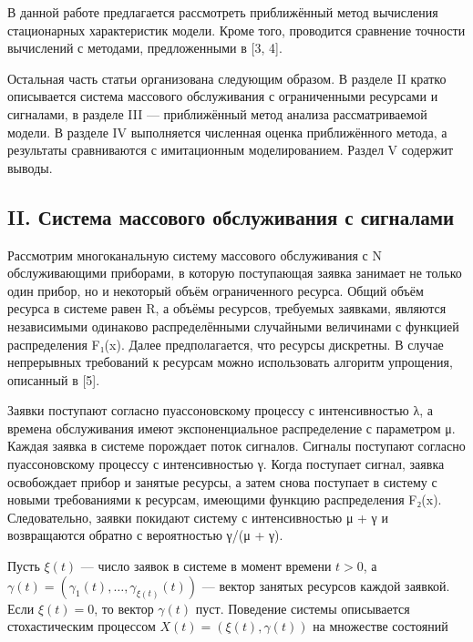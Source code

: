 В данной работе предлагается рассмотреть приближённый метод вычисления
стационарных характеристик модели. Кроме того, проводится сравнение
точности вычислений с методами, предложенными в {[}3, 4{]}.

Остальная часть статьи организована следующим образом. В разделе II
кратко описывается система массового обслуживания с ограниченными
ресурсами и сигналами, в разделе III --- приближённый метод анализа
рассматриваемой модели. В разделе IV выполняется численная оценка
приближённого метода, а результаты сравниваются с имитационным
моделированием. Раздел V содержит выводы.

\hypertarget{ii.-ux441ux438ux441ux442ux435ux43cux430-ux43cux430ux441ux441ux43eux432ux43eux433ux43e-ux43eux431ux441ux43bux443ux436ux438ux432ux430ux43dux438ux44f-ux441-ux441ux438ux433ux43dux430ux43bux430ux43cux438}{%
\subsection{II. Система массового обслуживания с
сигналами}\label{ii.-ux441ux438ux441ux442ux435ux43cux430-ux43cux430ux441ux441ux43eux432ux43eux433ux43e-ux43eux431ux441ux43bux443ux436ux438ux432ux430ux43dux438ux44f-ux441-ux441ux438ux433ux43dux430ux43bux430ux43cux438}}

Рассмотрим многоканальную систему массового обслуживания с N
обслуживающими приборами, в которую поступающая заявка занимает не
только один прибор, но и некоторый объём ограниченного ресурса. Общий
объём ресурса в системе равен R, а объёмы ресурсов, требуемых заявками,
являются независимыми одинаково распределёнными случайными величинами с
функцией распределения F₁(x). Далее предполагается, что ресурсы
дискретны. В случае непрерывных требований к ресурсам можно использовать
алгоритм упрощения, описанный в {[}5{]}.

Заявки поступают согласно пуассоновскому процессу с интенсивностью λ, а
времена обслуживания имеют экспоненциальное распределение с параметром
μ. Каждая заявка в системе порождает поток сигналов. Сигналы поступают
согласно пуассоновскому процессу с интенсивностью γ. Когда поступает
сигнал, заявка освобождает прибор и занятые ресурсы, а затем снова
поступает в систему с новыми требованиями к ресурсам, имеющими функцию
распределения F₂(x). Следовательно, заявки покидают систему с
интенсивностью μ + γ и возвращаются обратно с вероятностью γ/(μ + γ).

Пусть \(\xi(t)\) --- число заявок в системе в момент времени \(t > 0\),
а \(\gamma(t) = (\gamma_1(t), \ldots, \gamma_{\xi(t)}(t))\) --- вектор
занятых ресурсов каждой заявкой. Если \(\xi(t) = 0\), то вектор
\(\gamma(t)\) пуст. Поведение системы описывается стохастическим
процессом \(X(t) = (\xi(t), \gamma(t))\) на множестве состояний


